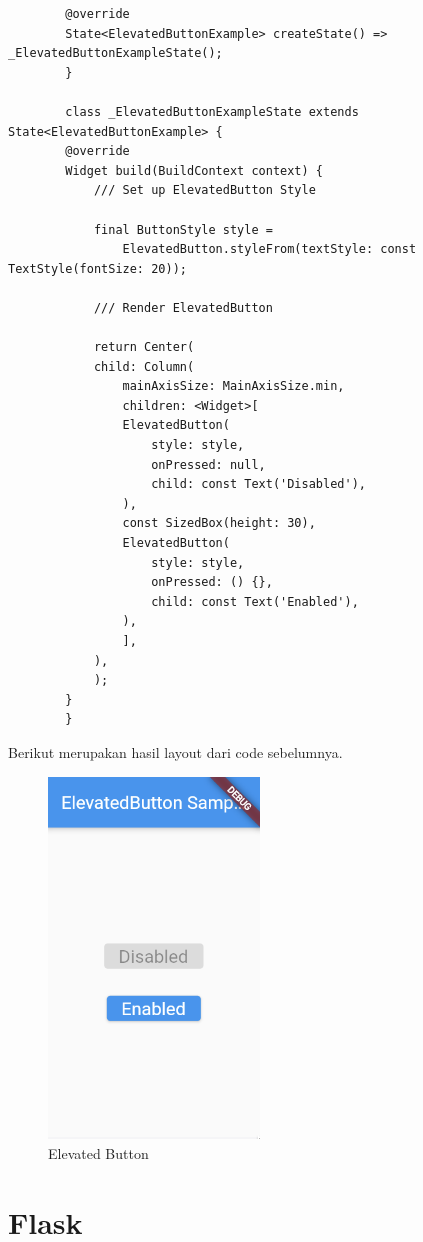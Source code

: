 \begin{spacing}{1.5}
\begin{enumerate}
\begin{lstlisting}
		@override
		State<ElevatedButtonExample> createState() => _ElevatedButtonExampleState();
		}

		class _ElevatedButtonExampleState extends State<ElevatedButtonExample> {
		@override
		Widget build(BuildContext context) {
			/// Set up ElevatedButton Style

			final ButtonStyle style =
				ElevatedButton.styleFrom(textStyle: const TextStyle(fontSize: 20));

			/// Render ElevatedButton

			return Center(
			child: Column(
				mainAxisSize: MainAxisSize.min,
				children: <Widget>[
				ElevatedButton(
					style: style,
					onPressed: null,
					child: const Text('Disabled'),
				),
				const SizedBox(height: 30),
				ElevatedButton(
					style: style,
					onPressed: () {},
					child: const Text('Enabled'),
				),
				],
			),
			);
		}
		}
	\end{lstlisting}

	Berikut merupakan hasil layout dari code sebelumnya.

	\begin{figure}[H]
		\centering
		\includegraphics[width=0.5\textwidth]{gambar/elevated_button.png}
		\caption{Elevated Button}
	\end{figure}

\end{enumerate}

\section{Flask}


\end{spacing}
